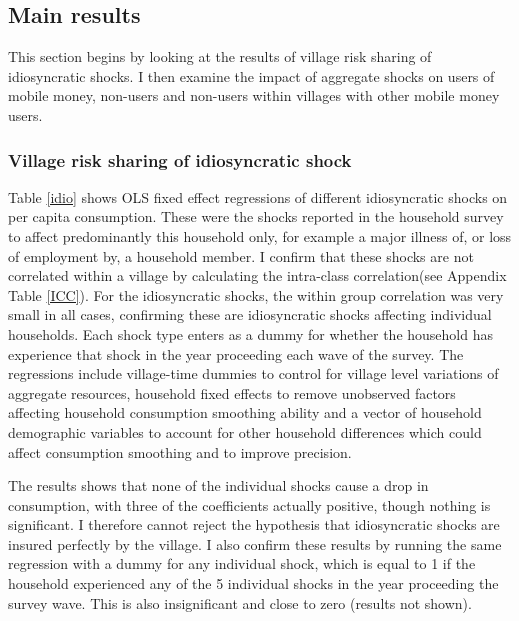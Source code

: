 \subsection{Main results}
This section begins by looking at the results of village risk sharing of idiosyncratic shocks. I then examine the impact of aggregate shocks on users of mobile money, non-users and non-users within villages with other mobile money users.  

\subsubsection{Village risk sharing of idiosyncratic shock}
Table \ref{idio} shows OLS fixed effect regressions of different idiosyncratic shocks on per capita consumption. These were the shocks reported in the household survey to affect predominantly this household only, for example a major illness of, or loss of employment by, a household member. I confirm that these shocks are not correlated within a village by calculating the intra-class correlation(see Appendix Table \ref{ICC}). For the idiosyncratic shocks, the within group correlation was very small in all cases, confirming these are idiosyncratic shocks affecting individual households.     
Each shock type enters as a dummy for whether the household has experience that shock in the year proceeding each wave of the survey. The regressions include village-time dummies to control for village level variations of aggregate resources, household fixed effects to remove unobserved factors affecting household consumption smoothing ability and a vector of household demographic variables to account for other household differences which could affect consumption smoothing and to improve precision. 

The results shows that none of the individual shocks cause a drop in consumption, with three of the coefficients actually positive, though nothing is significant. I therefore cannot reject the hypothesis that idiosyncratic shocks are insured perfectly by the village. I also confirm these results by running the same regression with a dummy for any individual shock, which is equal to 1 if the household experienced any of the 5 individual shocks in the year proceeding the survey wave. This is also insignificant and close to zero (results not shown).  



